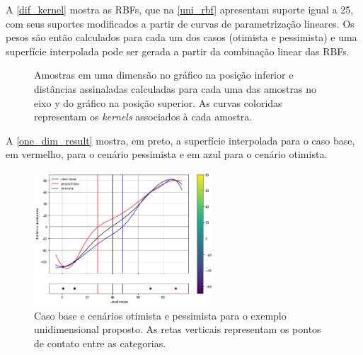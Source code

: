 A \autoref{dif_kernel} mostra as RBFs, que na \autoref{uni_rbf} apresentam suporte igual a 25, com seus suportes modificados a partir de curvas de parametrização lineares.  Os pesos são então calculados para cada um dos casos (otimista e pessimista) e uma superfície interpolada pode ser gerada a partir da combinação linear das RBFs.

\begin{figure}[H]
    \centering
    \caption{Amostras em uma dimensão no gráfico na posição inferior e distâncias assinaladas calculadas para cada uma das amostras no eixo y do gráfico na posição superior. As curvas coloridas representam os \textit{kernels} associados à cada amostra.} \label{dif_kernel}
     \hspace{1em}
\end{figure}

A \autoref{one_dim_result} mostra, em preto, a superfície interpolada para o caso base, em vermelho, para o cenário pessimista e em azul para o cenário otimista.

\begin{figure}[H]
	\caption{\label{one_dim_result} Caso base e cenários otimista e pessimista para o exemplo unidimensional proposto. As retas verticais representam os pontos de contato entre as categorias.}
	\centering
		\includegraphics[width=0.6\textwidth]{capitulo_3/imagens/all_kernels.png}
\end{figure}

